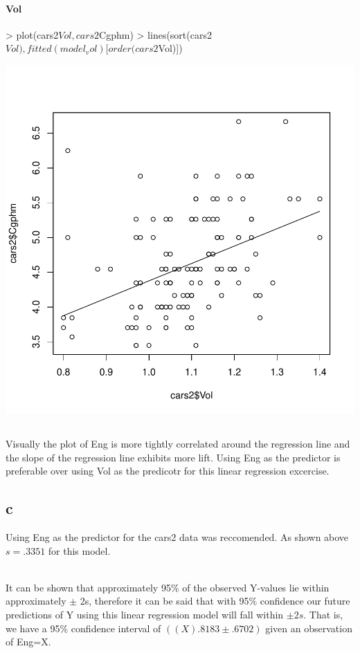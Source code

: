 \documentclass{article}
\begin{document}
\paragraph*{Vol}
\begin{Schunk}
\begin{Sinput}
> plot(cars2$Vol, cars2$Cgphm)
> lines(sort(cars2$Vol), fitted(model_vol)[order (cars2$Vol)])
\end{Sinput}
\end{Schunk}
\includegraphics{Assignment1b-010}

\subsection*{}
Visually the plot of Eng is more tightly correlated around the regression line and the slope of the regression line exhibits more lift. Using Eng as the predictor is preferable over using Vol as the predicotr for this linear regression excercise. 

\subsection*{c}
Using Eng as the predictor for the cars2 data was reccomended. As shown above $s=.3351$ for this model. 

\noindent
\\
It can be shown that approximately 95\% of the observed Y-values lie within approximately $\pm$ 2s, therefore it can be said that with 95\% confidence our future predictions of Y using this linear regression model will fall within $\pm 2s$. That is, we have a 95\% confidence interval of $((X).8183 \pm .6702)$ given an observation of Eng=X.  
\end{document}
